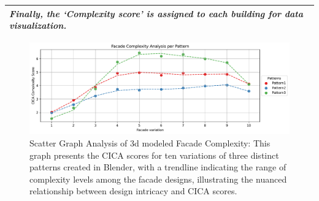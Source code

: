 \documentclass[final,5p,times]{elsarticle}%
\begin{document}
\begin{linenumbers}
\begin{table}[htb]
\begin{tabular}{|p{8cm}|}
                    \textit{Finally, the `Complexity score' is assigned to each building for data visualization.}\\
                \hline
                \end{tabular}
            \end{table}

            \begin{figure}[!htb]
                  \centering
                  \includegraphics[width= \linewidth]{Graphs/complexitygraphrender}
                  \caption{Scatter Graph Analysis of 3d modeled Facade Complexity: This graph presents the CICA scores for ten variations of three distinct patterns created in Blender, with a trendline indicating the range of complexity levels among the facade designs, illustrating the nuanced relationship between design intricacy and CICA scores.}
                  \label{fig:complexitygraphRender}
            \end{figure}


\end{linenumbers}
\end{document}
